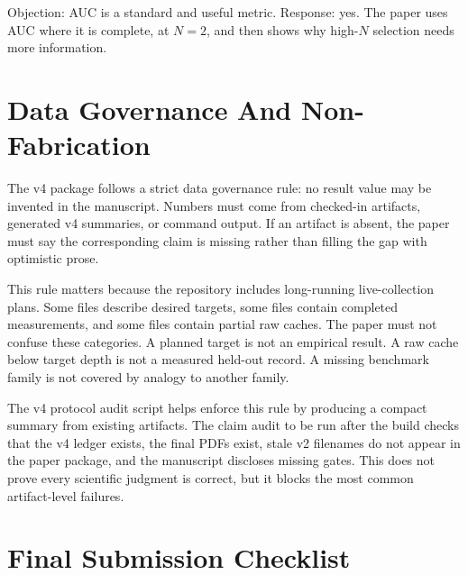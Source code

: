 Objection: AUC is a standard and useful metric. Response: yes. The paper uses
AUC where it is complete, at $N=2$, and then shows why high-$N$ selection needs
more information.

\section{Data Governance And Non-Fabrication}
\label{app:data-governance}

The v4 package follows a strict data governance rule: no result value may be
invented in the manuscript. Numbers must come from checked-in artifacts,
generated v4 summaries, or command output. If an artifact is absent, the paper
must say the corresponding claim is missing rather than filling the gap with
optimistic prose.

This rule matters because the repository includes long-running live-collection
plans. Some files describe desired targets, some files contain completed
measurements, and some files contain partial raw caches. The paper must not
confuse these categories. A planned target is not an empirical result. A raw
cache below target depth is not a measured held-out record. A missing benchmark
family is not covered by analogy to another family.

The v4 protocol audit script helps enforce this rule by producing a compact summary
from existing artifacts. The claim audit to be run after the build checks that
the v4 ledger exists, the final PDFs exist, stale v2 filenames do not appear
in the paper package, and the manuscript discloses missing gates. This does
not prove every scientific judgment is correct, but it blocks the most common
artifact-level failures.

\section{Final Submission Checklist}
\label{app:submission-checklist}

